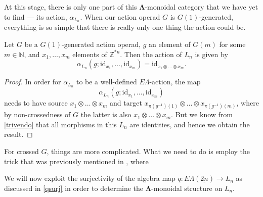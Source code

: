 \documentclass{amsbook} %
\newcommand{\id}{\textrm{id}}
\newcommand{\ML}{\mathbf{\Lambda}}
\newcommand{\ELnn}{E\Lambda(\underline{2n})}
\numberwithin{section}{chapter}
\begin{document}
At this stage, there is only one part of this $\ML$-monoidal category that we have yet to find --- its action, $\alpha_{L_n}$. When our action operad $G$ is $G(1)$-generated, everything is so simple that there is really only one thing the action could be.

\begin{lem} \label{G1act} Let $G$ be a $G(1)$-generated action operad, $g$ an element of $G(m)$ for some $m \in \mathbb{N}$, and $x_1, \ldots, x_m$ elements of $\mathbb{Z}^{\ast n}$. Then the action of $L_n$ is given by
  \[
    \alpha_{L_n}(  g  ;  \id_{x_1}, \ldots, \id_{x_m}  ) = \id_{x_1 \otimes \ldots \otimes x_m}.
  \]
\end{lem}
\begin{proof}
In order for $\alpha_{L_n}$ to be a well-defined $E\Lambda$-action, the map
  \[
    \alpha_{L_n}(g; \id_{x_1}, \ldots, \id_{x_m})
  \]
  needs to have source $x_1 \otimes \ldots \otimes x_m$ and target $x_{\pi(g^{-1})(1)} \otimes \ldots \otimes x_{\pi(g^{-1})(m)}$, where by non-crossedness of $G$ the latter is also $x_1 \otimes \ldots \otimes x_m$. But we know from \cref{trivendo} that all morphisms in this $L_n$ are identities, and hence we obtain the result.
\end{proof}

For crossed $G$, things are more complicated. What we need to do is employ the trick that was previously mentioned in , where 





We will now exploit the surjectivity of the algebra map $q \colon  \ELnn \rightarrow L_n$ as discussed in \cref{qsurj} in order to determine the $\ML$-monoidal structure on $L_n$.

\end{document}
